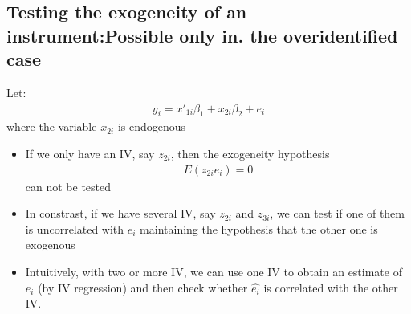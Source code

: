 \documentclass[a4paper,twoside,11pt]{article}
\begin{document}
\subsection{Testing the exogeneity of an instrument:Possible only in. the overidentified case}
Let:
\begin{equation*}
\begin{aligned}
y_i = x'_{1i} \beta_1 + x_{2i} \beta_2 + e_i
\end{aligned} 
\end{equation*}
where the variable $x_{2i}$ is endogenous
\begin{itemize}
    \item If we only have an IV, say $z_{2i}$, then the exogeneity hypothesis 
\newline
\begin{equation*}
\begin{aligned}
E(z_{2i} e_i) =0
\end{aligned} 
\end{equation*}
can not be tested
    \item In constrast, if we have several IV, say $z_{2i}$ and $z_{3i}$, we can test if one of them is uncorrelated with $e_i$ maintaining the hypothesis that the other one is exogenous
    \item Intuitively, with two or more IV, we can use one IV to obtain an estimate of $e_i$ (by IV regression) and then check whether $\hat{e_i}$ is correlated with the other IV.
\end{itemize}
\end{document}
